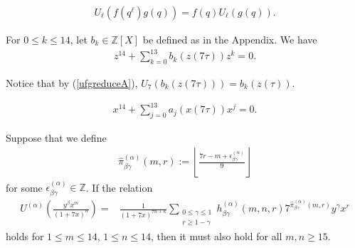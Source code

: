 \documentclass[10pt,a4paper]{amsart}
\begin{document}
\begin{align}
U_{\ell}\left(f(q^{\ell})g(q)\right) = f(q) U_{\ell}\left(g(q)\right).\label{ufgreduceA}
\end{align}

\begin{theorem}\label{modeqnz}
For $0\le k\le 14$, let $b_k\in\mathbb{Z}[X]$ be defined as in the Appendix.  We have
\begin{align}
z^{14}+\sum_{k=0}^{13}b_k(z(7\tau))z^k=0.\label{actmodeqnz}
\end{align}
\end{theorem}  Notice that by (\ref{ufgreduceA}), $U_{7}\left( b_k(z(7\tau)) \right)=b_k(z(\tau))$.

\begin{align}
x^{14}+\sum_{j=0}^{13}a_j(x(7\tau))x^j=0.\label{modeqnx}
\end{align}

\begin{lemma}\label{lowerboundpiabc}
Suppose that we define 
\begin{align}
\hat{\pi}^{(\alpha)}_{\beta\gamma}(m,r) := \left\lfloor \frac{7r-m+\epsilon^{(\alpha)}_{\beta\gamma}}{9} \right\rfloor\label{pihatvalues}
\end{align} for some $\epsilon^{(\alpha)}_{\beta\gamma}\in\mathbb{Z}$.  If the relation
\begin{align}
U^{(\alpha)}\left( \frac{y^{\beta}x^{m}}{(1+7x)^{n}} \right) =& \frac{1}{(1+7x)^{7n+\kappa}}\sum_{\substack{0\le\gamma\le 1\\ r\ge 1-\gamma}} h^{(\alpha)}_{\beta\gamma}(m,n,r) 7^{\hat{\pi}^{(\alpha)}_{\beta\gamma}(m,r)}y^{\gamma}x^r\label{lowerbounduaymoz}
\end{align} holds for $1\le m\le 14$, $1\le n\le 14$, then it must also hold for all $m,n\ge 15$.
\end{lemma}
\end{document}
